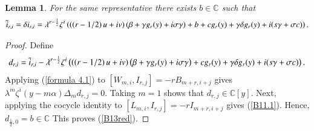 \documentclass[12pt,reqno]{amsart}
\def\C{\mathbb{C}}
\numberwithin{equation}{section}
\newtheorem{lemm}[theo]{Lemma}
\begin{document}
\begin{lemm}\label{tilde i}
    For the same representative there exists $b\in\C$ such that
    \begin{equation}\label{B13red}
\aligned
\Tilde i_{r,i}=\delta i_{r,i}
=\lambda^{r-\frac12}\zeta^i
\left(\left(\left(r-1/2\right)u+iv\right)
  \left(\beta+\gamma g_r(y)+i\sigma\gamma\right)+b+c g_r(y)
+\gamma \delta g_r(y)
        +i(s\gamma+\sigma c)
\right).
\endaligned
\end{equation}
\end{lemm}
\begin{proof}
    Define $$d_{r,i}=
\Tilde i_{r,i}
-\lambda^{r-\frac12}\zeta^i\left(
\left(\left(r-1/2\right)u+iv\right)
  \bigl(\beta+\gamma g_r(y)+i\sigma\gamma\bigr)+c g_r(y)
+\gamma \delta g_r(y)
        +i(s\gamma+\sigma c)
\right).$$
Applying (\ref{formula 4.1}) to $[W_{m,i},I_{r,j}]=-rB_{m+r,i+j}$ gives $\lambda^m\zeta^i(y-m\alpha)\Delta_md_{r,j}=0$. Taking $m=1$ shows that $d_{r,j}\in\C[y]$.
Next, applying the cocycle identity to $[L_{m,i},I_{r,j}]=-rI_{m+r,i+j}$ gives (\ref{B11.1}). Hence, $d_{\frac{1}{2},0}=b\in\C$ This proves (\ref{B13red}).
\end{proof}
\end{document}
